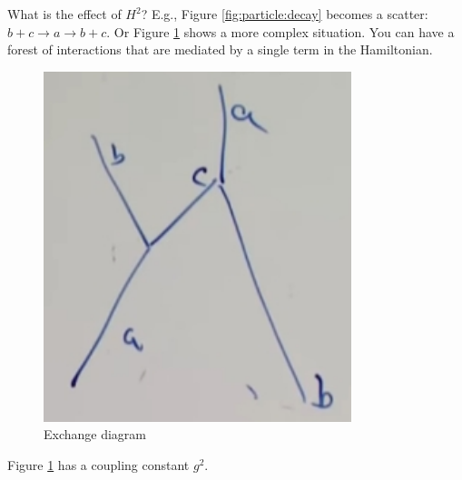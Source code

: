 \documentclass[]{article}
\begin{document}
What is the effect of $H^2$? E.g., Figure \ref{fig:particle:decay} becomes a scatter: $b+c \rightarrow a \rightarrow b + c$. Or Figure \ref{fig:scatter:annihilate} shows a more complex situation. You can have a forest of interactions that are mediated by a single term in the Hamiltonian.

\begin{figure}[H]
	\caption{Exchange diagram}\label{fig:scatter:annihilate}
	\includegraphics[width=0.8\textwidth]{scatter_annihilate}
\end{figure}

Figure \ref{fig:scatter:annihilate} has a coupling constant $g^2$.
\end{document}
